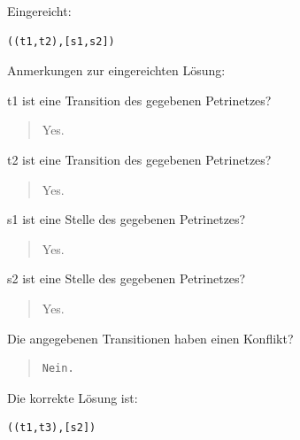 Eingereicht:


\begin{verbatim}
((t1,t2),[s1,s2])
\end{verbatim}


Anmerkungen zur eingereichten Lösung:

t1 ist eine Transition des gegebenen Petrinetzes?\begin{quote}Yes.\end{quote}t2 ist eine Transition des gegebenen Petrinetzes?\begin{quote}Yes.\end{quote}s1 ist eine Stelle des gegebenen Petrinetzes?\begin{quote}Yes.\end{quote}s2 ist eine Stelle des gegebenen Petrinetzes?\begin{quote}Yes.\end{quote}Die angegebenen Transitionen haben einen Konflikt?

\begin{quote}
\begin{verbatim}
Nein.
\end{verbatim}
\end{quote}

Die korrekte Lösung ist:
\begin{verbatim}
((t1,t3),[s2])
\end{verbatim}


